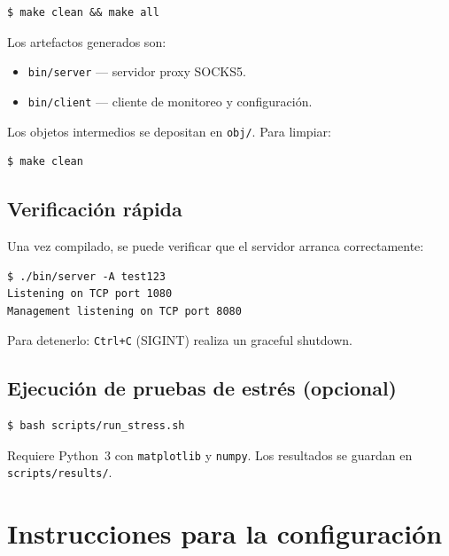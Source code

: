 \documentclass[12pt,a4paper]{article}
\begin{document}
\begin{lstlisting}[caption=Compilar el proyecto]
$ make clean && make all
\end{lstlisting}

Los artefactos generados son:

\begin{itemize}
    \item \texttt{bin/server} --- servidor proxy SOCKS5.
    \item \texttt{bin/client} --- cliente de monitoreo y configuración.
\end{itemize}

Los objetos intermedios se depositan en \texttt{obj/}. Para limpiar:

\begin{lstlisting}[caption=Limpiar artefactos de compilación]
$ make clean
\end{lstlisting}

\subsection{Verificación rápida}

Una vez compilado, se puede verificar que el servidor arranca correctamente:

\begin{lstlisting}[caption=Verificación de arranque]
$ ./bin/server -A test123
Listening on TCP port 1080
Management listening on TCP port 8080
\end{lstlisting}

Para detenerlo: \texttt{Ctrl+C} (SIGINT) realiza un graceful shutdown.

\subsection{Ejecución de pruebas de estrés (opcional)}

\begin{lstlisting}[caption=Ejecutar harness de estrés]
$ bash scripts/run_stress.sh
\end{lstlisting}

Requiere Python~3 con \texttt{matplotlib} y \texttt{numpy}. Los resultados se guardan en \texttt{scripts/results/}.

\section{Instrucciones para la configuración}
\end{document}
